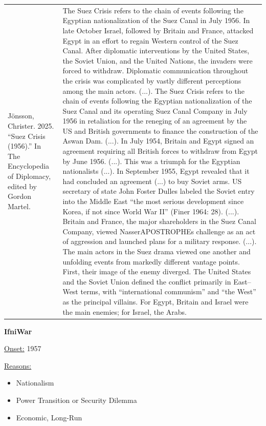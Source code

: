 {\begin{longtable}{p{}p{}}
Jönsson, Christer. 2025. “Suez Crisis (1956).” In The Encyclopedia of Diplomacy, edited by Gordon Martel. & The Suez Crisis refers to the chain of events following the Egyptian nationalization of the Suez Canal in July 1956. In late October Israel, followed by Britain and France, attacked Egypt in an effort to regain Western control of the Suez Canal. After diplomatic interventions by the United States, the Soviet Union, and the United Nations, the invaders were forced to withdraw. Diplomatic communication throughout the crisis was complicated by vastly different perceptions among the main actors. (...). The Suez Crisis refers to the chain of events following the Egyptian nationalization of the Suez Canal and its operating Suez Canal Company in July 1956 in retaliation for the reneging of an agreement by the US and British governments to finance the construction of the Aswan Dam. (...).
In July 1954, Britain and Egypt signed an agreement requiring all British forces to withdraw from Egypt by June 1956. (...). This was a triumph for the Egyptian nationalists (...). In September 1955, Egypt revealed that it had concluded an agreement (...) to buy Soviet arms. US secretary of state John Foster Dulles labeled the Soviet entry into the Middle East “the most serious development since Korea, if not since World War II” (Finer 1964: 28). (...). Britain and France, the major shareholders in the Suez Canal Company, viewed NasserAPOSTROPHEs challenge as an act of aggression and launched plans for a military response. (...).
The main actors in the Suez drama viewed one another and unfolding events from markedly different vantage points. First, their image of the enemy diverged. The United States and the Soviet Union defined the conflict primarily in East–West terms, with “international communism” and “the West” as the principal villains. For Egypt, Britain and Israel were the main enemies; for Israel, the Arabs.
\\
\end{longtable}}
\clearpage
         \textbf{IfniWar} 

          \underline{Onset:} 1957         

\underline{Reasons:}
\begin{itemize}
\item Nationalism
\item Power Transition or Security Dilemma
\item Economic, Long-Run
\end{itemize}

